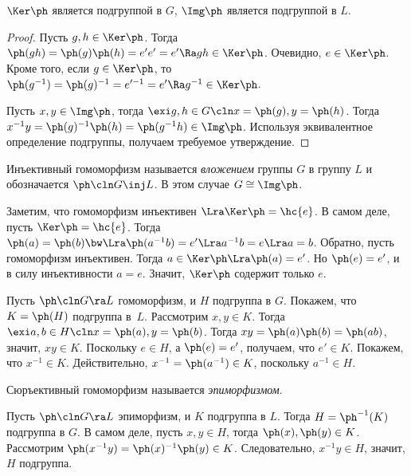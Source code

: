 \documentclass[a4paper]{article}
\newcommand{\kph}{\Ker \ph}
\begin{document}
\begin{stm}
$\kph$ является подгруппой в $G$, $\Img \ph$ является подгруппой в $L$.
\end{stm}
\begin{proof}
Пусть $g, h\in \kph$. Тогда $\ph(gh)=\ph(g)\ph(h)=e'e'=e' \Ra gh \in \kph$. Очевидно, $e \in \kph$. Кроме
того, если $g \in \kph$, то $\ph(g^{-1})=\ph(g)^{-1}=e'^{-1}=e' \Ra g^{-1} \in \kph$.

Пусть $x,y\in \Img \ph$, тогда $\exi g,h\in G\cln x=\ph(g), y=\ph(h)$. Тогда
$x^{-1}y=\ph(g)^{-1}\ph(h)=\ph(g^{-1}h)\in \Img\ph$. Используя эквивалентное определение подгруппы, получаем
требуемое утверждение.
\end{proof}

\begin{df}
Инъективный гомоморфизм называется \emph{вложением} группы $G$ в группу $L$ и обозначается $\ph\cln G \inj
L$. В этом случае $G \cong \Img \ph$.
\end{df}

Заметим, что гомоморфизм инъективен $\Lra \kph = \hc{e}$. В самом деле, пусть $\kph =\hc{e}$. Тогда
$\ph(a)=\ph(b) \bw\Lra \ph(a^{-1}b)=e' \Lra a^{-1}b=e \Lra a=b$. Обратно, пусть гомоморфизм инъективен. Тогда
$a \in \kph \Lra \ph(a)=e'$. Но $\ph(e)=e'$, и в силу инъективности $a=e$. Значит, $\kph$ содержит только $e$.

Пусть $\ph\cln G \ra L$ гомоморфизм, и $H$ подгруппа в $G$. Покажем, что $K = \ph(H)$ подгруппа в~$L$.
Рассмотрим $x, y \in K$. Тогда $\exi a, b \in H\cln x = \ph(a), y = \ph(b)$. Тогда $xy
=\ph(a)\ph(b)=\ph(ab)$, значит, $xy \in K$. Поскольку $e \in H$, а $\ph(e) =e'$, получаем, что $e' \in K$.
Покажем, что $x^{-1} \in K$. Действительно, $x^{-1}=\ph(a^{-1}) \in K$, поскольку $a^{-1} \in H$.

\begin{df}
Сюръективный гомоморфизм называется \emph{эпиморфизмом}.
\end{df}

Пусть $\ph\cln G \ra L$ эпиморфизм, и $K$ подгруппа в $L$. Тогда $H = \ph^{-1}(K)$ подгруппа в $G$. В
самом деле, пусть $x,y \in H$, тогда $\ph(x), \ph(y) \in K$. Рассмотрим $\ph(x^{-1}y)=\ph(x)^{-1}\ph(y) \in
K$. Следовательно, $x^{-1}y \in H$, значит, $H$ подгруппа.
\end{document}
